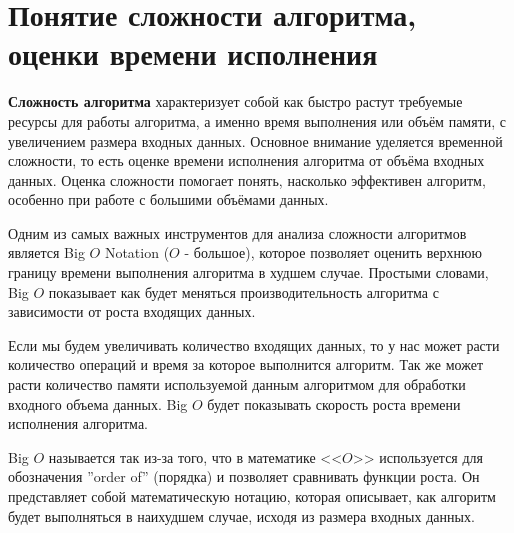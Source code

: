 \section{Понятие сложности алгоритма, оценки времени исполнения}
\textbf{Сложность алгоритма} характеризует собой как быстро растут требуемые ресурсы
для работы алгоритма, а именно время выполнения или объём памяти, с
увеличением размера входных данных. Основное внимание уделяется временной сложности,
то есть оценке времени исполнения алгоритма от объёма входных данных.
Оценка сложности помогает понять, насколько эффективен алгоритм, особенно при работе
с большими объёмами данных.

Одним из самых важных инструментов для анализа сложности алгоритмов является Big $O$ Notation ($O$ - большое),
которое позволяет оценить верхнюю границу времени выполнения алгоритма в худшем случае.
Простыми словами, Big $O$ показывает как будет меняться производительность алгоритма с зависимости
от роста входящих данных.

Если мы будем увеличивать количество входящих данных, то у нас может расти количество операций и время за
которое выполнится алгоритм. Так же может расти количество памяти используемой данным алгоритмом для обработки
входного объема данных. Big $O$ будет показывать скорость роста времени
исполнения алгоритма.

Big $O$ называется так из-за того, что в математике <<$O$>> используется для обозначения ''order of'' (порядка) и позволяет сравнивать функции роста.
Он представляет собой математическую нотацию, которая описывает, как алгоритм будет выполняться в наихудшем случае, исходя из размера входных данных.

